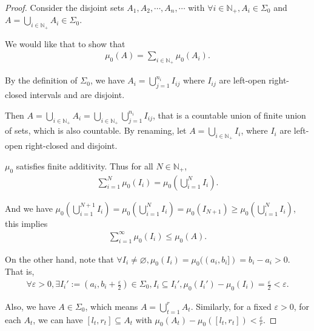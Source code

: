 \begin{proof}[Proof]
    Consider the disjoint sets $A_1, A_2,\cdots, A_n,\cdots  $ with $\forall i \in \mathbb{N} _+, A_i \in \Sigma_0$ and $A = \bigcup_{i \in \mathbb{N} _+} A_i \in \Sigma_0$.

    We would like that to show that 
    \begin{align*}
        \mu_0(A) = \sum _{i\in\mathbb{N} _+} \mu_0(A_i)
    .\end{align*}

    By the definition of $\Sigma_0$, we have $A_i = \bigcup_{j=1}^{n_i} I_{ij}$ where $I_{ij}$ are left-open right-closed intervals and are disjoint.

    Then $A = \bigcup_{i\in\mathbb{N} _+} A_i = \bigcup_{i\in\mathbb{N} _+}\bigcup_{j=1}^{n_i} I_{ij}$, that is a countable union of finite union of sets, which is also countable. By renaming, let $A = \bigcup_{i\in\mathbb{N} _+} I_i$, where $I_i$ are left-open right-closed and disjoint.
    
    $\mu_0$ satisfies finite additivity. Thus for all $N \in \mathbb{N} _+$,
    \begin{align*}
        \sum_{i=1}^N \mu_0(I_i) = \mu_0(\bigcup_{i=1}^N I_i)
    .\end{align*}

    And we have $\mu_0(\bigcup_{i=1}^{N+1} I_i) = \mu_0(\bigcup_{i=1}^N I_i) = \mu_0(I_{N+1}) \ge  \mu_0(\bigcup_{i=1}^N I_i)$, this implies
    \begin{align*}
        \sum_{i=1}^\infty \mu_0(I_i) \le \mu_0(A)
    .\end{align*}

    On the other hand, note that $\forall I_i \neq \varnothing, \mu_0(I_i) = \mu_0((a_i,b_i]) = b_i - a_i > 0$. That is, 
    \begin{align*}
        \forall \varepsilon > 0, \exists I_i' := (a_i, b_i + \frac{\varepsilon}{2} ) \in \Sigma_0, I_i \subseteq I_i', \mu_0(I_i') - \mu_0(I_i) = \frac{\varepsilon}{2} < \varepsilon
    .\end{align*}

    Also, we have $A \in \Sigma_0$, which means $A = \bigcup_{t=1}^{r} A_t$. Similarly, for a fixed $\varepsilon >0$, for each $A_t$, we can have $[l_t, r_t] \subseteq A_t$ with $\mu_0(A_t) - \mu_0([l_t, r_t]) < \frac{\varepsilon}{r} $.


\end{proof}

